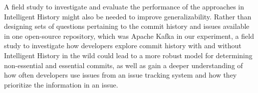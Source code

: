 A field study to investigate and evaluate the performance of the approaches in Intelligent History might also be needed to improve generalizability.
Rather than designing sets of questions pertaining to the commit history and issues available in one open-source repository,
which was Apache Kafka in our experiment,
a field study to investigate how developers explore commit history with and without Intelligent History in the wild 
could lead to a more robust model for determining non-essential and essential commits,
as well as gain a deeper understanding of how often developers use issues from an issue tracking system and how they prioritize the information in an issue.

\endinput

Any text after an \endinput is ignored.
You could put scraps here or things in progress.